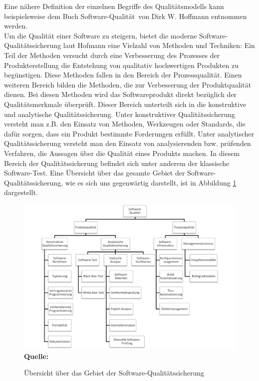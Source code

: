 Eine nähere Definition der einzelnen Begriffe des Qualitätsmodells kann beispielsweise dem Buch \grq Software-Qualität\grq\ von Dirk W. Hoffmann \cite[S.7 ff.]{hoffmann_software-qualitat_2013} entnommen werden.\\
Um die Qualität einer Software zu steigern, bietet die moderne Software-Qualitätssicherung laut Hofmann \cite[vgl. S.19 ff.]{hoffmann_software-qualitat_2013} eine Vielzahl von Methoden und Techniken:
Ein Teil der Methoden versucht durch eine Verbesserung des Prozesses der Produkterstellung die Entstehung von qualitativ hochwertigen Produkten zu begünstigen. Diese Methoden fallen in den Bereich der Prozessqualität.
Einen weiteren Bereich bilden die Methoden, die zur Verbesserung der Produktqualität dienen. Bei diesen Methoden wird das Softwareprodukt direkt bezüglich der Qualitätsmerkmale überprüft. Dieser Bereich unterteilt sich in die konstruktive und analytische Qualitätssicherung. Unter konstruktiver Qualitätssicherung versteht man z.B. den Einsatz von Methoden, Werkzeugen oder Standards, die
dafür sorgen, dass ein Produkt bestimmte Forderungen erfüllt. 
Unter analytischer Qualitätssicherung versteht man den Einsatz von analysierenden bzw. prüfenden Verfahren, die Aussagen
über die Qualität eines Produkts machen.
In diesem Bereich der Qualitätssicherung befindet sich unter anderem der klassische Software-Test. Eine Übersicht über das gesamte Gebiet der Software-Qualitätssicherung, wie es sich uns gegenwärtig darstellt, ist in Abbildung \ref{fig:softwareQualitätssicherung} dargestellt. 
\begin{figure}[htb]
  \centering  
  \includegraphics[scale=0.7]{img/softwarequalitaet.png}\\
  \footnotesize\sffamily\textbf{Quelle:} \cite[vgl. S.20]{hoffmann_software-qualitat_2013}
  \caption{Übersicht über das Gebiet der Software-Qualitätssicherung}
  \label{fig:softwareQualitätssicherung}
\end{figure}



